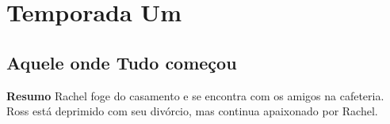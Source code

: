 \part{Temporada Um}
\chapter{Aquele onde Tudo começou}

\textbf{Resumo} Rachel foge do casamento e se encontra com os amigos na cafeteria. Ross está deprimido com seu divórcio, mas continua apaixonado por Rachel.

